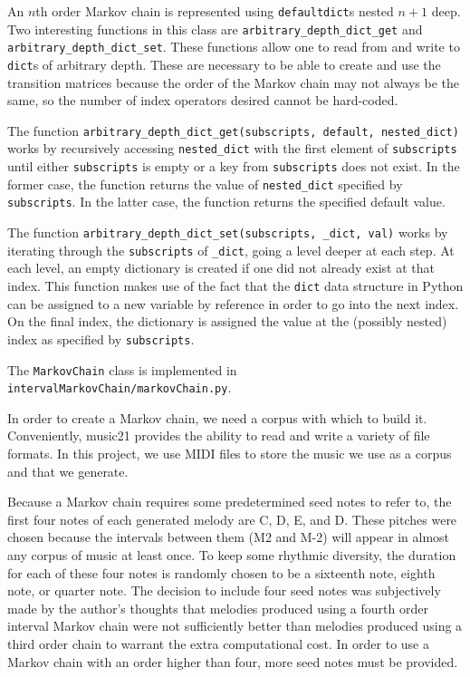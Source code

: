 An $n$th order Markov chain is represented using \texttt{defaultdict}s nested $n + 1$ deep.
Two interesting functions in this class are \texttt{arbitrary\_depth\_dict\_get} and \texttt{arbitrary\_depth\_dict\_set}.
These functions allow one to read from and write to \texttt{dict}s of arbitrary depth.
These are necessary to be able to create and use the transition matrices because the order of the Markov chain may not always be the same, so the number of index operators desired cannot be hard-coded.

The function \texttt{arbitrary\_depth\_dict\_get(subscripts, default, nested\_dict)} works by recursively accessing \texttt{nested\_dict} with the first element of \texttt{subscripts} until either \texttt{subscripts} is empty or a key from \texttt{subscripts} does not exist.
In the former case, the function returns the value of \texttt{nested\_dict} specified by \texttt{subscripts}.
In the latter case, the function returns the specified default value.

The function \texttt{arbitrary\_depth\_dict\_set(subscripts, \_dict, val)} works by iterating through the \texttt{subscripts} of \texttt{\_dict}, going a level deeper at each step.
At each level, an empty dictionary is created if one did not already exist at that index.
This function makes use of the fact that the \texttt{dict} data structure in Python can be assigned to a new variable by reference in order to go into the next index.
On the final index, the dictionary is assigned the value at the (possibly nested) index as specified by \texttt{subscripts}.

The \texttt{MarkovChain} class is implemented in \texttt{intervalMarkovChain/markovChain.py}.

In order to create a Markov chain, we need a corpus with which to build it.
Conveniently, music21 provides the ability to read and write a variety of file formats.
In this project, we use MIDI files to store the music we use as a corpus and that we generate.

Because a Markov chain requires some predetermined seed notes to refer to, the first four notes of each generated melody are C, D, E, and D.
These pitches were chosen because the intervals between them (M2 and M-2) will appear in almost any corpus of music at least once.
To keep some rhythmic diversity, the duration for each of these four notes is randomly chosen to be a sixteenth note, eighth note, or quarter note.
The decision to include four seed notes was subjectively made by the author's thoughts that melodies produced using a fourth order interval Markov chain were not sufficiently better than melodies produced using a third order chain to warrant the extra computational cost.
In order to use a Markov chain with an order higher than four, more seed notes must be provided.

